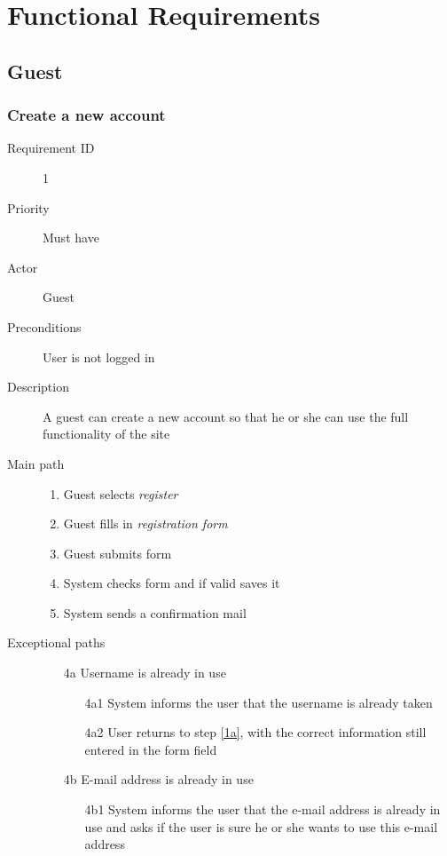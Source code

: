 \section{Functional Requirements}
	\subsection{Guest}
		\subsubsection{Create a new account} 
			\begin{description}
				\item[Requirement ID] 1
				\item[Priority] Must have
				\item[Actor] Guest
				\item[Preconditions] User is not logged in
				\item[Description]
				A guest can create a new account so that he or she 
				can use the full functionality of the site
 				\item[Main path]
 					\begin{enumerate}
						\item Guest selects \emph{register}
						\item \label{1a} Guest fills in \emph{registration form}
						\item Guest submits form
						\item System checks form and if valid saves it
						\item System sends a confirmation mail 
					\end{enumerate}
				\item[Exceptional paths]
					\begin{enumerate}
						\item[4a] Username is already in use
							\begin{itemize}
								\item[4a1] System informs the user that the username is already taken 
								\item[4a2] User returns to step \ref{1a}, with the correct information still entered in the form field
							\end{itemize}
						\item[4b] E-mail address is already in use
							\begin{itemize}
								\item[4b1] System informs the user that the e-mail address is already in use and asks if the user is sure he or she wants to use this e-mail address

\end{itemize}
\end{enumerate}
\end{description}
